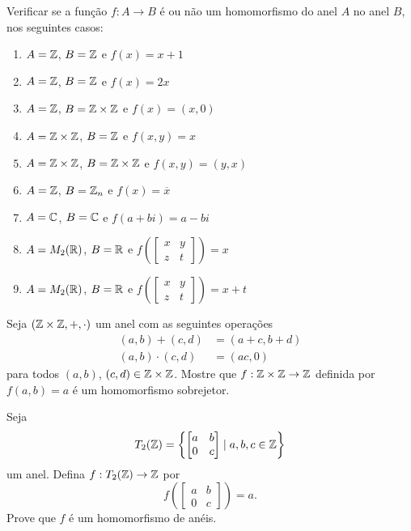 \documentclass[12pt]{exam}
\begin{document}
 Verificar se a função $f : A \to B$ é ou não um homomorfismo do anel $A$ no anel $B$, nos seguintes casos:
\begin{enumerate}[label=({\alph*})]
    \item $A = \mathbb{Z}$, $B = \mathbb{Z}$ e $f(x) = x + 1$

    \item $A = \mathbb{Z}$, $B = \mathbb{Z}$ e $f(x) = 2x$

    \item $A = \mathbb{Z}$, $B = \mathbb{Z} \times \mathbb{Z}$ e $f(x) = (x, 0)$

    \item $A = \mathbb{Z} \times \mathbb{Z}$, $B = \mathbb{Z}$ e $f(x,y) = x$

    \item $A = \mathbb{Z} \times \mathbb{Z}$, $B = \mathbb{Z} \times \mathbb{Z}$ e $f(x,y) = (y,x)$

    \item $A = \mathbb{Z}$, $B = \mathbb{Z}_n$ e $f(x) = \overline{x}$

    \item $A = \mathbb{C}$, $B = \mathbb{C}$ e $f(a + bi) = a - bi$

    \item $A = M_2(\mathbb{R})$, $B = \mathbb{R}$ e $f\left(\begin{bmatrix}
        x & y\\z & t
    \end{bmatrix}\right) = x$

    \item $A = M_2(\mathbb{R})$, $B = \mathbb{R}$ e $f\left(\begin{bmatrix}
        x & y\\z & t
    \end{bmatrix}\right) = x + t$
\end{enumerate}

\vspace{.3cm}

\questao{} Seja $(\mathbb{Z}\times\mathbb{Z}, +, \cdot)$ um anel com as seguintes operações
\begin{align*}
    (a, b) + (c, d) &= (a + c, b + d)\\
    (a, b)\cdot (c, d) &= (ac, 0)
\end{align*}
para todos $(a, b)$, $(c, d) \in \mathbb{Z}\times\mathbb{Z}$.
Mostre que $ f : \mathbb{Z}\times\mathbb{Z} \to \mathbb{Z}$ definida por $f(a, b) = a$ é um homomorfismo sobrejetor.

\vspace{.3cm}

\questao{} Seja
\[
    T_2(\mathbb{Z}) = \left\{\begin{bmatrix}a & b\\ 0 & c\end{bmatrix} \mid a, b, c \in \mathbb{Z}\right\}
\]
um anel. Defina $f : T_2(\mathbb{Z}) \to \mathbb{Z}$ por
\[
    f\left(\begin{bmatrix}a & b\\ 0 & c\end{bmatrix}\right) = a.
\]
Prove que $f$ é um homomorfismo de anéis.
\end{document}
